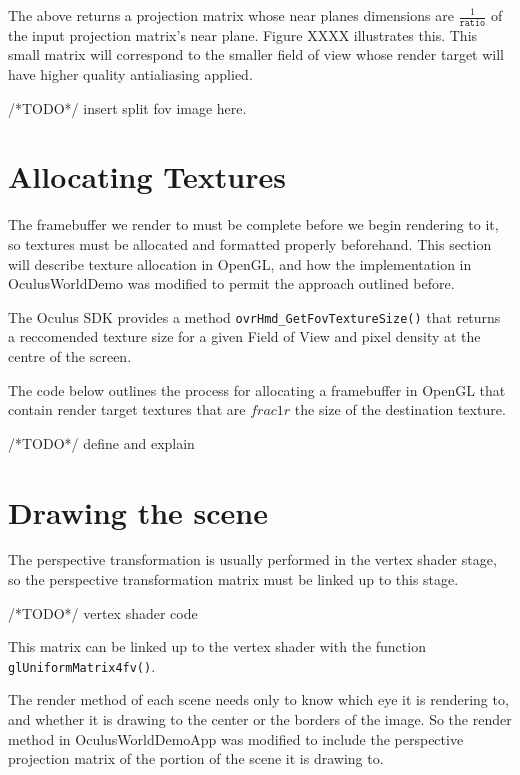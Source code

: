 \documentclass[12pt,a4paper,twoside,openright]{report}
\begin{document}
The above returns a projection matrix whose near planes dimensions are $\frac{1}{\texttt{ratio}}$ of the input projection matrix's near plane. Figure XXXX illustrates this. This small matrix will correspond to the smaller field of view whose render target will have higher quality antialiasing applied. 

/*TODO*/ insert split fov image here. 

\section{Allocating Textures}

The framebuffer we render to must be complete before we begin rendering to it, so textures must be allocated and formatted properly beforehand. This section will describe texture allocation in OpenGL, and how the implementation in OculusWorldDemo was modified to permit the approach outlined before. 
 
The Oculus SDK provides a method \texttt{ovrHmd\_GetFovTextureSize()} that returns a reccomended texture size for a given Field of View and pixel density at the centre of the screen.

The code below outlines the process for allocating a framebuffer in OpenGL that contain render target textures that are $frac{1}{r}$ the size of the destination texture.

\begin{blockcode}

\end{blockcode}
/*TODO*/ define and explain


\section{Drawing the scene}

The perspective transformation is usually performed in the vertex shader stage, so the perspective transformation matrix must be linked up to this stage.

\begin{blockcode}
/*TODO*/ vertex shader code
\end{blockcode} 
This matrix can be linked up to the vertex shader with the function \texttt{glUniformMatrix4fv()}.

The render method of each scene needs only to know which eye it is rendering to, and whether it is drawing to the center or the borders of the image. 
So the render method in OculusWorldDemoApp was modified to include the perspective projection matrix of the portion of the scene it is drawing to.
\end{document}
